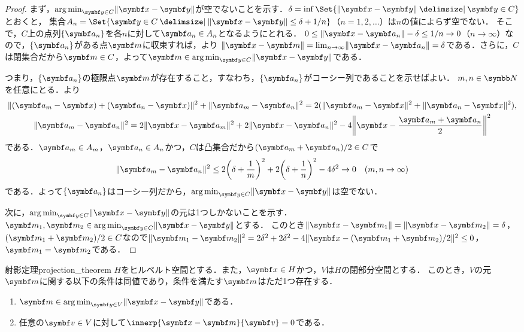 \documentclass[../../main]{subfiles}
\begin{document}
\begin{proof}
  まず，\(\argmin_{\vect{y}\in C}\vnorm{\vect{x}-\vect{y}}\)が空でないことを示す．\(\delta=\inf\Set{\vnorm{\vect{x}-\vect{y}}\given\vect{y}\in C}\)とおくと，
  集合\(A_n=\Set{\vect{y}\in C\given\vnorm{\vect{x}-\vect{y}}\leq\delta+1/n}\)（\(n=1,2,\dotsc\)）は\(n\)の値によらず空でない．
  そこで，\(C\)上の点列\(\seq{\vect{a}_n}\)を各\(n\)に対して\(\vect{a}_n\in A_n\)となるようにとれる．
  \(0\leq\vnorm{\vect{x}-\vect{a}_n}-\delta\leq 1/n\to 0\)（\(n\to\infty\)）なので，\(\seq{\vect{a}_n}\)がある点\(\vect{m}\)に収束すれば，より
  \(\vnorm{\vect{x}-\vect{m}}=\lim_{n\to\infty}\vnorm{\vect{x}-\vect{a}_n}=\delta\)である．さらに，\(C\)は閉集合だから\(\vect{m}\in C\)，よって\(\vect{m}\in\argmin_{\vect{y}\in C}\vnorm{\vect{x}-\vect{y}}\)である．

  つまり，\(\seq{\vect{a}_n}\)の極限点\(\vect{m}\)が存在すること，すなわち，\(\seq{\vect{a}_n}\)がコーシー列であることを示せばよい．
  \(m,n\in\numset{N}\)を任意にとる．より
  \begin{gather*}
    \vnorm{(\vect{a}_m-\vect{x})+(\vect{a}_n-\vect{x})}^2+\vnorm{\vect{a}_m-\vect{a}_n}^2 = 2(\vnorm{\vect{a}_m-\vect{x}}^2+\vnorm{\vect{a}_n-\vect{x}}^2), \\
    \vnorm{\vect{a}_m-\vect{a}_n}^2 = 2\vnorm{\vect{x}-\vect{a}_m}^2+2\vnorm{\vect{x}-\vect{a}_n}^2-4\vnorm*{\vect{x}-\frac{\vect{a}_m+\vect{a}_n}{2}}^2
  \end{gather*}
  である．\(\vect{a}_m\in A_m\)，\(\vect{a}_n\in A_n\)かつ，\(C\)は凸集合だから\((\vect{a}_m+\vect{a}_n)/2\in C\)で
  \[
    \vnorm{\vect{a}_m-\vect{a}_n}^2 \leq 2\pqty*{\delta+\frac{1}{m}}^2+2\pqty*{\delta+\frac{1}{n}}^2-4\delta^2
    \to 0\quad(m,n\to\infty)
  \]
  である．よって\(\seq{\vect{a}_n}\)はコーシー列だから，\(\argmin_{\vect{y}\in C}\vnorm{\vect{x}-\vect{y}}\)は空でない．

  次に，\(\argmin_{\vect{y}\in C}\vnorm{\vect{x}-\vect{y}}\)の元は1つしかないことを示す．\(\vect{m}_1,\vect{m}_2\in\argmin_{\vect{y}\in C}\vnorm{\vect{x}-\vect{y}}\)とする．
  このとき\(\vnorm{\vect{x}-\vect{m}_1}=\vnorm{\vect{x}-\vect{m}_2}=\delta\)，\((\vect{m}_1+\vect{m}_2)/2\in C\)なので\(\vnorm{\vect{m}_1-\vect{m}_2}^2=2\delta^2+2\delta^2-4\vnorm{\vect{x}-(\vect{m}_1+\vect{m}_2)/2}^2\leq 0\)，\(\vect{m}_1=\vect{m}_2\)である．
\end{proof}

\begin{theorem}{射影定理}{projection_theorem}
  \(H\)をヒルベルト空間とする．また，\(\vect{x}\in H\)かつ，\(V\)は\(H\)の閉部分空間とする．
  このとき，\(V\)の元\(\vect{m}\)に関する以下の条件は同値であり，条件を満たす\(\vect{m}\)はただ1つ存在する．
  \begin{enumerate}
    \item \(\vect{m}\in\argmin_{\vect{y}\in V}\vnorm{\vect{x}-\vect{y}}\)である．
    \item 任意の\(\vect{v}\in V\)に対して\(\innerp{\vect{x}-\vect{m}}{\vect{v}}=0\)である．
  \end{enumerate}
\end{theorem}
\end{document}
